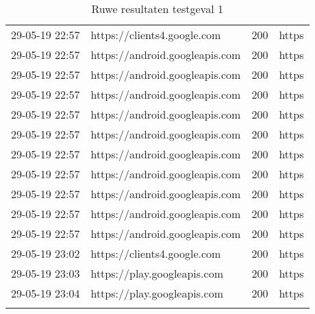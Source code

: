 \begin{longtable}[c]{@{}llll@{}}
    29-05-19 22:57 & https://clients4.google.com & 200 & https \\
    29-05-19 22:57 & https://android.googleapis.com & 200 & https \\
    29-05-19 22:57 & https://android.googleapis.com & 200 & https \\
    29-05-19 22:57 & https://android.googleapis.com & 200 & https \\
    29-05-19 22:57 & https://android.googleapis.com & 200 & https \\
    29-05-19 22:57 & https://android.googleapis.com & 200 & https \\
    29-05-19 22:57 & https://android.googleapis.com & 200 & https \\
    29-05-19 22:57 & https://android.googleapis.com & 200 & https \\
    29-05-19 22:57 & https://android.googleapis.com & 200 & https \\
    29-05-19 22:57 & https://android.googleapis.com & 200 & https \\
    29-05-19 22:57 & https://android.googleapis.com & 200 & https \\
    29-05-19 23:02 & https://clients4.google.com & 200 & https \\
    29-05-19 23:03 & https://play.googleapis.com & 200 & https \\
    29-05-19 23:04 & https://play.googleapis.com & 200 & https \\* \bottomrule
    \caption{Ruwe resultaten testgeval 1}
    \label{tab:rawresults-1}\\
\end{longtable}